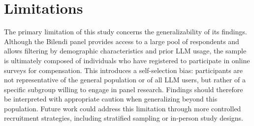 \section{Limitations}
\label{sec:limitations}

The primary limitation of this study concerns the generalizability of its findings. Although the Bilendi panel provides access to a large pool of respondents and allows filtering by demographic characteristics and prior LLM usage, the sample is ultimately composed of individuals who have registered to participate in online surveys for compensation. This introduces a self-selection bias: participants are not representative of the general population or of all LLM users, but rather of a specific subgroup willing to engage in panel research. Findings should therefore be interpreted with appropriate caution when generalizing beyond this population. Future work could address this limitation through more controlled recruitment strategies, including stratified sampling or in-person study designs.